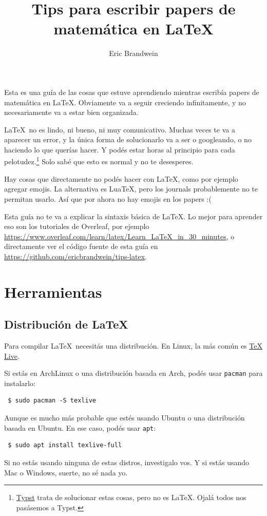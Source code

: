 \documentclass{article}
\title{Tips para escribir papers de matemática en \LaTeX}
\author{Eric Brandwein}
\begin{document}
\maketitle

Esta es una guía de las cosas que estuve aprendiendo mientras escribía papers de matemática en \LaTeX. Obviamente va a seguir creciendo infinitamente, y no necesariamente va a estar bien organizada.

\LaTeX\ no es lindo, ni bueno, ni muy comunicativo. Muchas veces te va a aparecer un error, y la única forma de solucionarlo va a ser o googleando, o no haciendo lo que querías hacer. Y podés estar horas al principio para cada pelotudez.\footnote{\href{https://typst.app/}{Typst} trata de solucionar estas cosas, pero no es \LaTeX. Ojalá todos nos pasásemos a Typst.} Solo sabé que esto es normal y no te desesperes.

Hay cosas que directamente no podés hacer con \LaTeX, como por ejemplo agregar emojis. La alternativa es LuaTeX, pero los journals probablemente no te permitan usarlo. Así que por ahora no hay emojis en los papers :(

Esta guía no te va a explicar la sintaxis básica de \LaTeX. Lo mejor para aprender eso son los tutoriales de Overleaf, por ejemplo \url{https://www.overleaf.com/learn/latex/Learn_LaTeX_in_30_minutes}, o directamente ver el código fuente de esta guía en \url{https://github.com/ericbrandwein/tips-latex}.

\newpage
\tableofcontents

\section{Herramientas}
\subsection{Distribución de \LaTeX}
Para compilar \LaTeX\ necesitás una distribución. En Linux, la más común es \href{https://www.tug.org/texlive/}{TeX Live}.

Si estás en ArchLinux o una distribución basada en Arch, podés usar \texttt{pacman} para instalarlo:
\begin{verbatim}
 $ sudo pacman -S texlive
\end{verbatim}
Aunque es mucho más probable que estés usando Ubuntu o una distribución basada en Ubuntu. En ese caso, podés usar \texttt{apt}:
\begin{verbatim}
 $ sudo apt install texlive-full
\end{verbatim}
Si no estás usando ninguna de estas distros, investigalo vos. Y si estás usando Mac o Windows, suerte, no sé nada yo.
\end{document}
